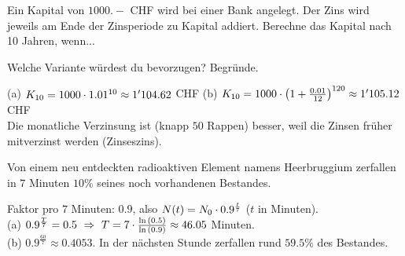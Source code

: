 \documentclass[11pt]{exam}
\begin{document}
\begin{questions}
\question[4] %
Ein Kapital von $1000.-$ CHF wird bei einer Bank angelegt. Der Zins wird jeweils am Ende der Zinsperiode zu Kapital addiert. Berechne das Kapital nach 10 Jahren, wenn...
Welche Variante würdest du bevorzugen? Begründe.
{\begin{solution}
		(a) $K_{10}=1000\cdot1.01^{10}\approx1'104.62$ CHF \qquad (b) $K_{10}=1000\cdot\left(1+\frac{0.01}{12}\right)^{120}\approx1'105.12$ CHF\\
		Die monatliche Verzinsung ist (knapp $50$ Rappen) besser, weil die Zinsen früher mitverzinst werden (Zinseszins).
\end{solution}}
{}

\question[5]
Von einem neu entdeckten radioaktiven Element namens Heerbruggium zerfallen in $7$ Minuten $10\%$ seines noch vorhandenen Bestandes.
{\begin{solution}
		Faktor pro $7$ Minuten: $0.9$, also $N(t)=N_0\cdot0.9^{\frac{t}{7}}$ ($t$ in Minuten).\\
		(a) $0.9^{\frac{T}{7}}=0.5\ \Rightarrow\ T=7\*\frac{\ln{0.5}}{\ln{0.9}}\approx46.05$ Minuten.\\
		(b) $0.9^{\frac{60}{7}}\approx0.4053$. In der nächsten Stunde zerfallen rund $59.5\%$ des Bestandes.
\end{solution}}
{}


\end{questions}
\end{document}
